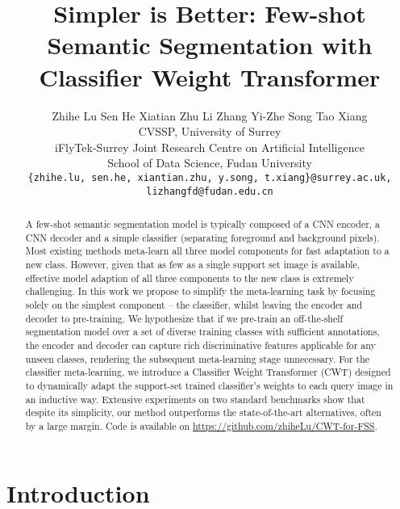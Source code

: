 \documentclass[10pt,twocolumn,letterpaper]{article}
\begin{document}
\title{Simpler is Better: Few-shot Semantic Segmentation with Classifier Weight Transformer}

\author{Zhihe Lu Sen He Xiatian Zhu Li Zhang Yi-Zhe Song Tao Xiang \\
CVSSP, University of Surrey \\ 
iFlyTek-Surrey Joint Research Centre on Artificial Intelligence \\
School of Data Science, Fudan University \\
{\tt\small \{zhihe.lu, sen.he, xiantian.zhu, y.song, t.xiang\}@surrey.ac.uk, lizhangfd@fudan.edu.cn}
}

\maketitle
\ificcvfinal\thispagestyle{empty}\fi

\begin{abstract}
A few-shot semantic segmentation model is typically composed of a CNN encoder, a CNN decoder and a simple classifier (separating foreground and background pixels). Most existing methods meta-learn all three model components for fast adaptation to a new class. However, given that as few as a single support set image is available, effective model adaption of all three components to the new class is extremely challenging. In this work we propose to simplify the meta-learning task by focusing solely on the simplest component -- the classifier, whilst leaving the encoder and decoder to pre-training. We hypothesize that if we pre-train an off-the-shelf segmentation model over a set of diverse training classes with sufficient annotations, the encoder and decoder can capture rich discriminative features applicable for any unseen classes, rendering the subsequent meta-learning stage unnecessary. For the classifier meta-learning, we introduce a Classifier Weight Transformer (CWT) designed to dynamically adapt the support-set trained classifier's weights to each query image in an inductive way. 
Extensive experiments on two standard benchmarks show that despite its simplicity, our method outperforms the state-of-the-art alternatives, often by a large margin. Code is available on \href{https://github.com/zhiheLu/CWT-for-FSS}{https://github.com/zhiheLu/CWT-for-FSS}.
\end{abstract}



\vspace{-0.4cm}
\section{Introduction}
\end{document}
